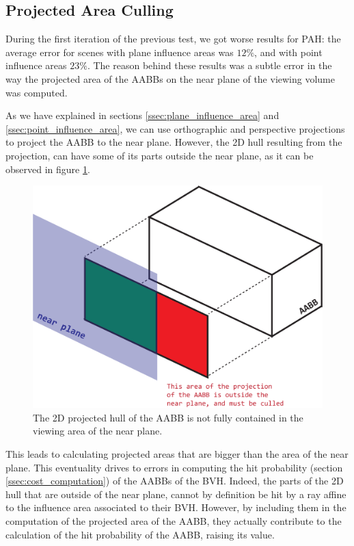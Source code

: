 \documentclass{PoliMi_MasterThesis}
\begin{document}
\subsection{Projected Area Culling} \label{ssec:projected_area_culling}
During the first iteration of the previous test, we got worse results for PAH: the average error for scenes with plane influence areas was $12\%$, and with point influence areas $23\%$. The reason behind these results was a subtle error in the way the projected area of the AABBs on the near plane of the viewing volume was computed.

As we have explained in sections \ref{ssec:plane_influence_area} and \ref{ssec:point_influence_area}, we can use orthographic and perspective projections to project the AABB to the near plane. However, the 2D hull resulting from the projection, can have some of its parts outside the near plane, as it can be observed in figure \ref{fig:projection_outside_near_plane}. 

\begin{figure}[H]
	\centering
	\includegraphics[width=\textwidth*\real{0.65}]{Images/near_plane_culling.png}
	\caption{The 2D projected hull of the AABB is not fully contained in the viewing area of the near plane.}
	\label{fig:projection_outside_near_plane}
\end{figure}

This leads to calculating projected areas that are bigger than the area of the near plane. This eventuality drives to errors in computing the hit probability (section \ref{ssec:cost_computation}) of the AABBs of the BVH. Indeed, the parts of the 2D hull that are outside of the near plane, cannot by definition be hit by a ray affine to the influence area associated to their BVH. However, by including them in the computation of the projected area of the AABB, they actually contribute to the calculation of the hit probability of the AABB, raising its value.
\end{document}
